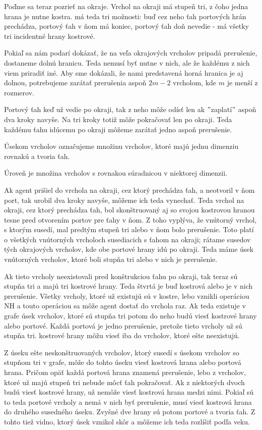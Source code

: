 Poďme sa teraz pozrieť na okraje. Vrchol na okraji má stupeň tri, z čoho jedna
hrana je nutne kostra. má teda tri možnosti: buď cez neho ťah portových hrán
prechádza, portový ťah v ňom má koniec, portový ťah doň nevedie - má všetky
tri incidentné hrany kostrové.

Pokiaľ sa nám podarí dokázať, že na veľa okrajových vrcholov pripadá
prerušenie, dostaneme dolnú hranicu. Teda nemusí byť nutne v nich, ale že 
každému z nich viem priradiť iné. Aby sme dokázali, že nami predstavená
horná hranica je aj dolnou, potrebujeme zarátať prerušenia aspoň $2m - 2$
vrcholom, kde $m$ je menší z rozmerov.

Portový ťah keď už vedie po okraji, tak z neho môže odísť len ak
$"$zaplatí$"$ aspoň dva kroky navyše. Na tri kroky totiž môže pokračovať len
po okraji. Teda každému ťahu idúcemu po okraji môžeme zarátať jedno aspoň
prerušenie.

\begin{ozn}
Úsekom vrcholov označujeme množinu vrcholov, ktoré majú jednu dimenziu
rovnakú a tvoria ťah.

Úroveň je množina vrcholov s rovnakou súradnicou v niektorej dimenzii.
\end{ozn}

Ak agent prišiel do vrchola na okraji, cez ktorý prechádza ťah, a neotvoril
v ňom port, tak urobil dva kroky navyše, môžeme ich teda vynechať. Teda vrchol
na okraji, cez ktorý prechádza ťah, bol skonštruovaný aj so svojou kostrovou 
hranou tesne pred otvorením portov pre ťahy v ňom. Z toho vyplýva, že
vnútorný vrchol, s ktorým susedí, mal predtým stupeň tri alebo v ňom bolo
prerušenie. Toto platí o všetkých vnútorných vrcholoch susediacich s ťahom
na okraji; rátame susedov tých okrajových vrcholov, kde obe portové hrany
idú po okraji. Teda máme úsek vnútorných vrcholov, ktoré boli stupňa tri
alebo v nich je prerušenie.


Ak tieto vrcholy neexistovali pred konštrukciou
ťahu po okraji, tak teraz sú stupňa tri a majú tri kostrové hrany. Teda
štvrtá je buď kostrová alebo je v nich prerušenie.
Všetky vrcholy, ktoré už existujú sú v kostre, lebo vznikli operáciou NH a
touto operáciou sa môže agent dostať do vrchola raz. Ak teda existuje v
grafe úsek
vrcholov, ktoré sú stupňa tri potom do neho budú viesť kostrové hrany alebo
portové. Každá portová je jedno prerušenie, pretože tieto vrcholy už sú
stupňa tri. kostrové hrany môžu viesť iba do vrcholov, ktoré ešte
neexistujú.

Z úseku ešte neskonštruovaných vrcholov, ktorý susedí s úsekom vrcholov so
stupňom tri v grafe, môže do tohto úseku viesť kostrová hrana alebo portová
hrana. Pričom opäť každá portová hrana znamená prerušenie, lebo z vrcholov,
ktoré už majú stupeň tri nebude môcť ťah pokračovať. Ak z niektorých dvoch
budú viesť kostrové hrany, už nemôže viesť kostrová hrana medzi nimi. Pokiaľ
sú to teda portové vrcholy a nemá v nich byť prerušenie, musí viesť kostrová
hrana do druhého susedného úseku. Zvyšné dve hrany sú potom portové a tvoria
ťah. Z tohto tiež vidno, ktorý úsek vznikol skôr a môžeme ich teda rozlíšiť
podľa veku.

